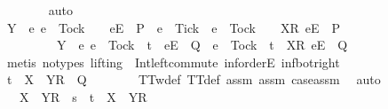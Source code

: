 \begin{isabellebody}
\ \ \ \ \ \ \isamarkupfalse%
\ auto\ \ \ \ \isanewline
\ \ \ \ \isamarkupfalse%
\ \isamarkupfalse%
\ {\isachardoublequoteopen}Y\ {\isasyminter}\ {\isacharbraceleft}e{\isachardot}\ e\ {\isasymnoteq}\ Tock\ {\isasymand}\ {\isasymrho}\ {\isacharat}\ {\isacharbrackleft}{\isacharbrackleft}e{\isacharbrackright}\isactrlsub E{\isacharbrackright}\ {\isasymin}\ P\ {\isasymand}\ e\ {\isasymnoteq}\ Tick\ {\isasymor}\ e\ {\isacharequal}\ Tock\ {\isasymand}\ {\isasymrho}\ {\isacharat}\ {\isacharbrackleft}{\isacharbrackleft}X{\isacharbrackright}\isactrlsub R{\isacharcomma}\ {\isacharbrackleft}e{\isacharbrackright}\isactrlsub E{\isacharbrackright}\ {\isasymin}\ P{\isacharbraceright}\ {\isacharequal}\ {\isacharbraceleft}{\isacharbraceright}\isanewline
\ \ \ \ \ \ \ \ {\isasymand}\ Y\ {\isasyminter}\ {\isacharbraceleft}e{\isachardot}\ e\ {\isasymnoteq}\ Tock\ {\isasymand}\ t{\isacharprime}\ {\isacharat}\ {\isacharbrackleft}{\isacharbrackleft}e{\isacharbrackright}\isactrlsub E{\isacharbrackright}\ {\isasymin}\ Q\ {\isasymor}\ e\ {\isacharequal}\ Tock\ {\isasymand}\ t{\isacharprime}\ {\isacharat}\ {\isacharbrackleft}{\isacharbrackleft}X{\isacharbrackright}\isactrlsub R{\isacharcomma}\ {\isacharbrackleft}e{\isacharbrackright}\isactrlsub E{\isacharbrackright}\ {\isasymin}\ Q{\isacharbraceright}\ {\isacharequal}\ {\isacharbraceleft}{\isacharbraceright}{\isachardoublequoteclose}\isanewline
\ \ \ \ \ \ \isamarkupfalse%
\ {\isacharparenleft}metis\ {\isacharparenleft}no{\isacharunderscore}types{\isacharcomma}\ lifting{\isacharparenright}\ {}\ Int{\isacharunderscore}left{\isacharunderscore}commute\ inf{\isachardot}orderE\ inf{\isacharunderscore}bot{\isacharunderscore}right{\isacharparenright}\isanewline
\ \ \ \ \isamarkupfalse%
\ \isamarkupfalse%
\ {\isachardoublequoteopen}t{\isacharprime}\ {\isacharat}\ {\isacharbrackleft}{\isacharbrackleft}X\ {\isasymunion}\ Y{\isacharbrackright}\isactrlsub R{\isacharbrackright}\ {\isasymin}\ Q{\isachardoublequoteclose}\isanewline
\ \ \ \ \ \ \isamarkupfalse%
\ TT{}w{\isacharunderscore}def\ TT{\isacharunderscore}def\ assm{}\ assm{}\ case{\isacharunderscore}assm\ \isamarkupfalse%
\ auto\isanewline
\ \ \ \ \isamarkupfalse%
\ \isamarkupfalse%
\ {\isachardoublequoteopen}{\isasymrho}\ {\isacharat}\ {\isacharbrackleft}{\isacharbrackleft}X\ {\isasymunion}\ Y{\isacharbrackright}\isactrlsub R{\isacharbrackright}\ {\isasymnoteq}\ s\ {\isacharat}\ t{\isacharprime}\ {\isacharat}\ {\isacharbrackleft}{\isacharbrackleft}X\ {\isasymunion}\ Y{\isacharbrackright}\isactrlsub R{\isacharbrackright}{\isachardoublequoteclose}\isanewline

\end{isabellebody}
